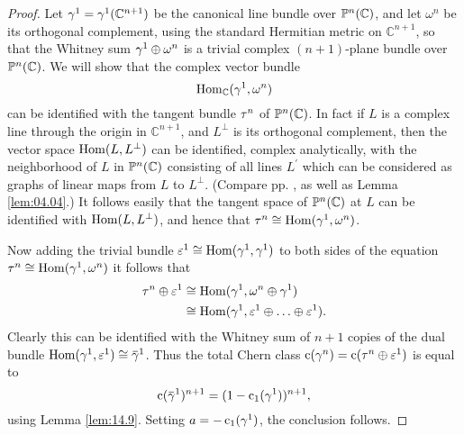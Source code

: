 \documentclass[../main]{subfiles}
\begin{document}
\begin{proof} Let $\gamma^{1}=\gamma^{1}(\mathbb{C}^{n+1})$ be the canonical line bundle over $\mathbb{P}^{n}(\mathbb{C})$, and let $\omega^{n}$ be its orthogonal complement, using the standard Hermitian metric on $\mathbb{C}^{n+1}$, so that the Whitney sum $\gamma^{1} \oplus \omega^{n}$ is a trivial complex $(n+1)$-plane bundle over $\mathbb{P}^{n}(\mathbb{C})$. We will show that the complex vector bundle
\[
\operatorname{Hom}_{\mathbb{C}}(\gamma^{1}, \omega^{n})
\]
can be identified with the tangent bundle $\tau_{}^n$ of $\mathbb{P}^{n}(\mathbb{C})$. In fact if $L$ is a complex line through the origin in $\mathbb{C}^{n+1}$, and $L^{\perp}$ is its orthogonal complement, then the vector space $\operatorname{Hom}(L, L^{\perp})$ can be identified, complex analytically, with the neighborhood of $L$ in $\mathbb{P}^{n}(\mathbb{C})$ consisting of all lines $L^{\prime}$ which can be considered as graphs of linear maps from $L$ to $L^{\perp}$. (Compare pp. \pageref{lem:05.01},\pageref{prob-5-B} as well as Lemma \ref{lem:04.04}.) It follows easily that the tangent space of $\mathbb{P}^{n}(\mathbb{C})$ at $L$ can be identified with $\operatorname{Hom}(L, L^{\perp})$, and hence that $\tau_{}^n \cong \operatorname{Hom}(\gamma^{1}, \omega^{n})$.

Now adding the trivial bundle $\varepsilon^{1} \cong \operatorname{Hom}(\gamma^{1}, \gamma^{1})$ to both sides of the equation $\tau_{}^n \cong \operatorname{Hom}(\gamma^{1}, \omega^{n})$ it follows that
\[
\begin{aligned}
\tau^{n}\oplus \varepsilon^1 & \cong \operatorname{Hom}(\gamma^{1}, \omega^{n} \oplus \gamma^{1}) \\
& \cong \operatorname{Hom}(\gamma^{1}, \varepsilon^{1} \oplus \ldots \oplus \varepsilon^{1}) .
\end{aligned}
\]
Clearly this can be identified with the Whitney sum of $n+1$ copies of the dual bundle $\Hom(\tautological^{1}, \trivialbundle^{1}) \cong \xoverline{\tautological}^{1}$. Thus the total Chern class $\operatorname{c}(\gamma^{n})=\operatorname{c}(\tau_{}^n \oplus \varepsilon^{1})$ is equal to
\[
\chernclass(\xoverline{\tautological}^{1})^{n+1}=(1-\chernclass_{1}(\tautological^{1}))^{n+1},
\]
using Lemma \ref{lem:14.9}. Setting $a=-\operatorname{c}_{1}(\gamma^{1})$, the conclusion follows.\end{proof}
\end{document}
